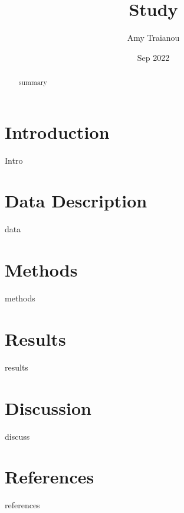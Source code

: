 \documentclass[12pt, letterpaper, twoside]{article}
\title{Study}
\author{Amy Traianou}
\date{Sep 2022}
\begin{document}
\maketitle

\begin{abstract}
summary
\end{abstract}

\section*{Introduction}
Intro

\section*{Data Description}
data

\section*{Methods}
methods

\section*{Results}
results

\section*{Discussion}
discuss

\section*{References}
references
\end{document}
